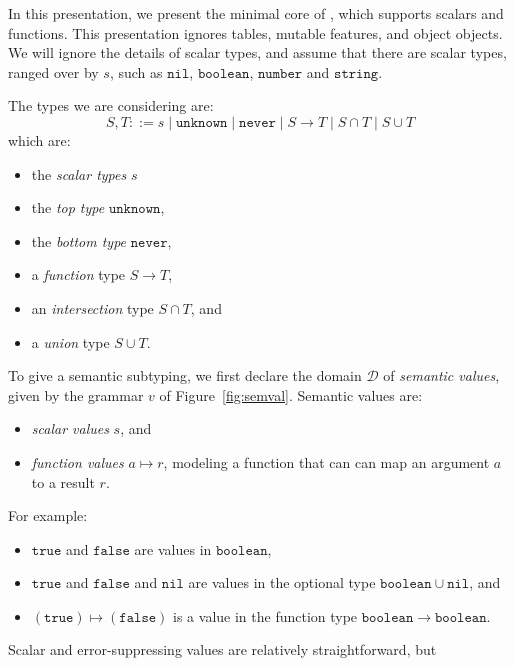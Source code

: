\documentclass[acmsmall,review,screen]{acmart}
\newcommand{\NEVER}{\mathtt{never}}
\newcommand{\UNKNOWN}{\mathtt{unknown}}
\newcommand{\NIL}{\mathtt{nil}}
\newcommand{\TRUE}{\mathtt{true}}
\newcommand{\FALSE}{\mathtt{false}}
\newcommand{\BOOLEAN}{\mathtt{boolean}}
\newcommand{\NUMBER}{\mathtt{number}}
\newcommand{\STRING}{\mathtt{string}}
\newcommand{\fun}{\mathbin{\rightarrow}}
\begin{document}
In this presentation, we present the minimal core of ,
which supports scalars and functions. This presentation ignores
tables, mutable features, and object objects.
We will ignore the details of scalar types,
and assume that there are scalar types, ranged over by $s$,
such as $\NIL$, $\BOOLEAN$, $\NUMBER$ and $\STRING$.

The types we are considering are:
\[
S, T ::= s \mid \UNKNOWN \mid \NEVER \mid S \fun T \mid S \cap T \mid S \cup T
\]
which are:
\begin{itemize}

\item the \emph{scalar types} $s$
  
\item the \emph{top type} $\UNKNOWN$,

\item the \emph{bottom type} $\NEVER$,

\item a \emph{function} type $S \fun T$,

\item an \emph{intersection} type $S \cap T$, and

\item a \emph{union} type $S \cup T$.

\end{itemize}
To give a semantic subtyping, we first declare the domain $\mathcal{D}$
of \emph{semantic values}, given by the grammar $v$ of Figure~\ref{fig:semval}.
Semantic values are:
\begin{itemize}
  
\item \emph{scalar values} $s$, and

\item \emph{function values} $a \mapsto r$,
  modeling a function that can can map an argument $a$ to
  a result $r$.

\end{itemize}
For example:
\begin{itemize}
  
\item $\TRUE$ and $\FALSE$ are values in $\BOOLEAN$,
\item $\TRUE$ and $\FALSE$ and $\NIL$ are values in the optional type $\BOOLEAN \cup \NIL$,
  and 
\item $(\TRUE) \mapsto (\FALSE)$ is a value in the function type $\BOOLEAN \fun \BOOLEAN$.

\end{itemize}
Scalar and error-suppressing values are relatively straightforward, but
\end{document}
